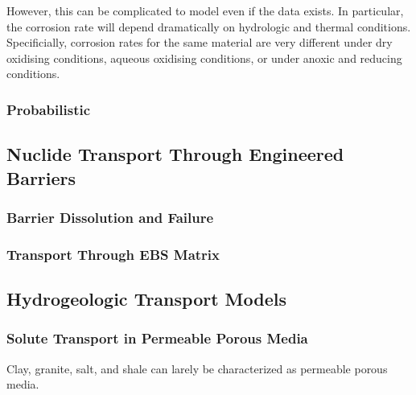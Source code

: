 However, this can be complicated to model even if the data exists. In  
particular, the corrosion rate will depend 
dramatically on hydrologic and thermal 
conditions. Specificially, corrosion rates for the same material are 
very different under dry oxidising conditions,
aqueous oxidising conditions,
or under anoxic and reducing conditions.

\subsubsection{Probabilistic}


\subsection{Nuclide Transport Through Engineered Barriers}

\subsubsection{Barrier Dissolution and Failure}

\subsubsection{Transport Through EBS Matrix}



\subsection{Hydrogeologic Transport Models}

\subsubsection{Solute Transport in Permeable Porous Media}
Clay, granite, salt, and shale can larely be characterized as 
permeable porous media.

%

